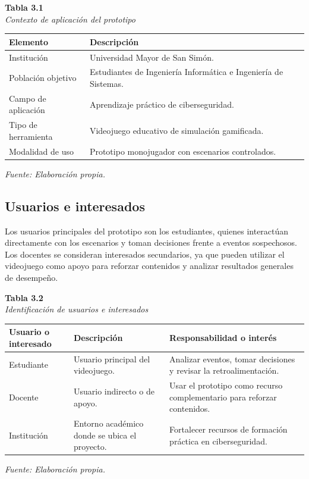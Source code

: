 \begin{center}
\textbf{Tabla 3.1}\\
\textit{Contexto de aplicaci\'{o}n del prototipo}

\vspace{0.2cm}
\begin{tabular}{|p{}|p{}|}
\hline
\textbf{Elemento} & \textbf{Descripci\'{o}n} \\
\hline
Instituci\'{o}n & Universidad Mayor de San Sim\'{o}n. \\
\hline
Poblaci\'{o}n objetivo & Estudiantes de Ingenier\'{i}a Inform\'{a}tica e Ingenier\'{i}a de Sistemas. \\
\hline
Campo de aplicaci\'{o}n & Aprendizaje pr\'{a}ctico de ciberseguridad. \\
\hline
Tipo de herramienta & Videojuego educativo de simulaci\'{o}n gamificada. \\
\hline
Modalidad de uso & Prototipo monojugador con escenarios controlados. \\
\hline
\end{tabular}

\textit{Fuente: Elaboraci\'{o}n propia.}
\end{center}

\subsection{Usuarios e interesados}

Los usuarios principales del prototipo son los estudiantes, quienes interact\'{u}an directamente con los escenarios y toman decisiones frente a eventos sospechosos. Los docentes se consideran interesados secundarios, ya que pueden utilizar el videojuego como apoyo para reforzar contenidos y analizar resultados generales de desempe\~{n}o.

\begin{center}
\textbf{Tabla 3.2}\\
\textit{Identificaci\'{o}n de usuarios e interesados}

\vspace{0.2cm}
\begin{tabular}{|p{}|p{}|p{}|}
\hline
\textbf{Usuario o interesado} & \textbf{Descripci\'{o}n} & \textbf{Responsabilidad o inter\'{e}s} \\
\hline
Estudiante & Usuario principal del videojuego. & Analizar eventos, tomar decisiones y revisar la retroalimentaci\'{o}n. \\
\hline
Docente & Usuario indirecto o de apoyo. & Usar el prototipo como recurso complementario para reforzar contenidos. \\
\hline
Instituci\'{o}n & Entorno acad\'{e}mico donde se ubica el proyecto. & Fortalecer recursos de formaci\'{o}n pr\'{a}ctica en ciberseguridad. \\
\hline
\end{tabular}

\textit{Fuente: Elaboraci\'{o}n propia.}
\end{center}

